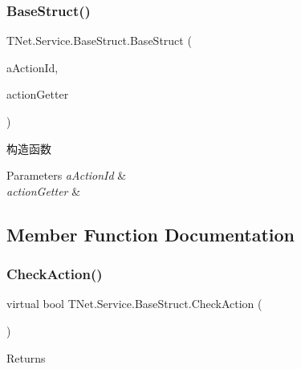 \subsubsection{\texorpdfstring{Base\+Struct()}{BaseStruct()}}
{\footnotesize\ttfamily T\+Net.\+Service.\+Base\+Struct.\+Base\+Struct (\begin{DoxyParamCaption}\item[{int}]{a\+Action\+Id,  }\item[{\mbox{\hyperlink{class_t_net_1_1_service_1_1_action_getter}{Action\+Getter}}}]{action\+Getter }\end{DoxyParamCaption})\hspace{0.3cm}{\ttfamily [protected]}}



构造函数 


\begin{DoxyParams}{Parameters}
{\em a\+Action\+Id} & \\
\hline
{\em action\+Getter} & \\
\hline
\end{DoxyParams}


\subsection{Member Function Documentation}
\mbox{\label{class_t_net_1_1_service_1_1_base_struct_a1e1ae8e1d5e424c6d1858d375bc9e61d}} 
\subsubsection{\texorpdfstring{Check\+Action()}{CheckAction()}}
{\footnotesize\ttfamily virtual bool T\+Net.\+Service.\+Base\+Struct.\+Check\+Action (\begin{DoxyParamCaption}{ }\end{DoxyParamCaption})\hspace{0.3cm}{\ttfamily [virtual]}}





\begin{DoxyReturn}{Returns}

\end{DoxyReturn}


